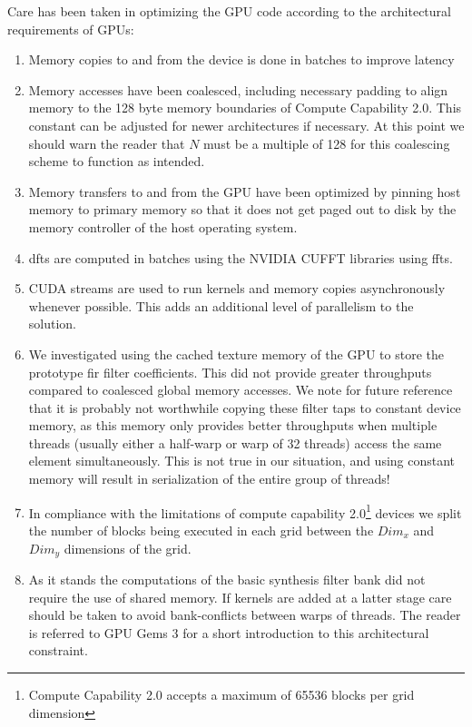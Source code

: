 \documentclass[a4paper,10pt]{article}
\begin{document}
Care has been taken in optimizing the GPU code according to the architectural requirements of GPUs: 
\begin{enumerate}
 \item Memory copies to and from the device is done in batches to improve latency
 \item Memory accesses have been coalesced, including necessary padding to align memory to the 128 byte memory boundaries of Compute Capability 2.0. This constant 
 can be adjusted for newer architectures if necessary. At this point we should warn the reader that $N$ must be a multiple of 128 for this coalescing scheme to function
 as intended.
 \item Memory transfers to and from the GPU have been optimized by pinning host memory to primary memory so that it does not get paged out to disk by the memory 
 controller of the host operating system.
 \item \gls{dft}s are computed in batches using the NVIDIA CUFFT libraries using \gls{fft}s.
 \item CUDA streams are used to run kernels and memory copies asynchronously whenever possible. This adds an additional level of parallelism to the solution.
 \item We investigated using the cached texture memory of the GPU to store the prototype \gls{fir} filter coefficients. This did not provide greater throughputs compared to
 coalesced global memory accesses. We note for future reference that it is probably not worthwhile copying these filter taps to constant device memory, as this memory only 
 provides better throughputs when multiple threads (usually either a half-warp or warp of 32 threads) access the same element simultaneously. This is not true in our situation, and
 using constant memory will result in serialization of the entire group of threads!
 \item In compliance with the limitations of compute capability 2.0\footnote{Compute Capability 2.0 accepts a maximum of 65536 blocks per grid dimension} devices we split the 
 number of blocks being executed in each grid between the $Dim_x$ and $Dim_y$ dimensions of the grid.
 \item As it stands the computations of the basic synthesis filter bank did not require the use of shared memory. If kernels are added at a latter stage care should be taken
 to avoid bank-conflicts between warps of threads. The reader is referred to GPU Gems 3 \cite[ch. 3]{harris2007parallel} for a short introduction to this architectural constraint.
\end{enumerate}
\end{document}
